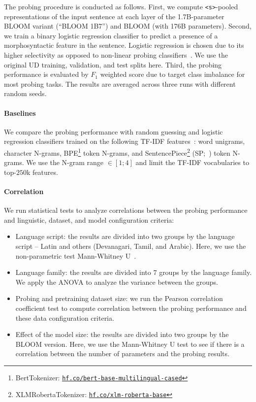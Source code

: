 \documentclass[twoside,11pt]{article}
\begin{document}
The probing procedure is conducted as follows. First, we compute \texttt{<s>}-pooled representations of the input sentence at each layer of the 1.7B-parameter BLOOM variant (``BLOOM 1B7'') and BLOOM (with 176B parameters). Second, we train a binary logistic regression classifier to predict a presence of a morphosyntactic feature in the sentence. Logistic regression is chosen due to its higher selectivity as opposed to non-linear probing classifiers~\citep{hewitt-liang-2019-designing}. We use the original UD training, validation, and test splits here. Third, the probing performance is evaluated by $F_1$ weighted score due to target class imbalance for most probing tasks. The results are averaged across three runs with different random seeds.

\paragraph{Baselines} We compare the probing performance with random guessing and logistic regression classifiers trained on the following TF-IDF features~\citep{salton1973specification}: word unigrams, character N-grams, BPE\footnote{BertTokenizer: \href{https://hf.co/bert-base-multilingual-cased}{\texttt{hf.co/bert-base-multilingual-cased}}} token N-grams, and  SentencePiece\footnote{XLMRobertaTokenizer: \href{https://hf.co/xlm-roberta-base}{\texttt{hf.co/xlm-roberta-base}}} (SP;~\citealp{kudo-richardson-2018-sentencepiece}) token N-grams. We use the N-gram range $\in [1; 4]$ and limit the TF-IDF vocabularies to top-$250$k features. 

\paragraph{Correlation} We run statistical tests to analyze correlations between the probing performance and linguistic, dataset, and model configuration criteria:
\begin{itemize}
    \item Language script: the results are divided into two groups by the language script -- Latin and others (Devanagari, Tamil, and Arabic). Here, we use the non-parametric test Mann-Whitney U~\citep{mann1947controlling}.
    \item Language family: the results are divided into $7$ groups by the language family. We apply the ANOVA to analyze the variance between the groups.
    \item Probing and pretraining dataset size: we run the Pearson correlation coefficient test \citep{pearson1895vii} to compute correlation between the probing performance and these data configuration criteria.
    \item Effect of the model size: the results are divided into two groups by the BLOOM version. Here, we use the Mann-Whitney U test to see if there is a correlation between the number of parameters and the probing results.
\end{itemize}
\end{document}
